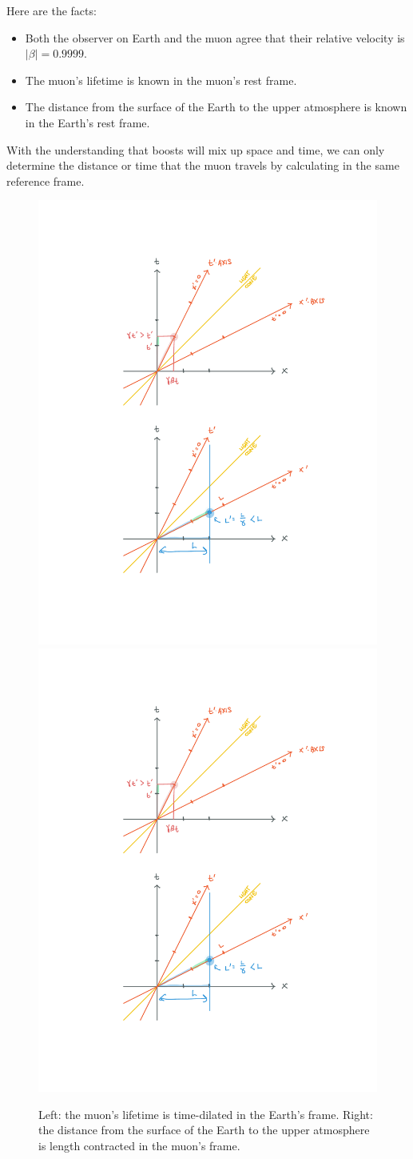\documentclass[12pt]{article}
\begin{document}

Here are the facts:
\begin{itemize}
    \item Both the observer on Earth and the muon agree that their relative velocity is $|\beta| = 0.9999$. 
    \item The muon's lifetime is known in the muon's rest frame. 
    \item The distance from the surface of the Earth to the upper atmosphere is known in the Earth's rest frame. 
\end{itemize}
With the understanding that boosts will mix up space and time, we can only determine the distance or time that the muon travels by calculating in the same reference frame. 


\begin{figure}[tb]
    \centering
    \includegraphics[width=.48\textwidth]{figures/rel_time_dil.pdf}
    \quad
    \includegraphics[width=.48\textwidth]{figures/rel_len_contractino.pdf}
    \caption{Left: the muon's lifetime is time-dilated in the Earth's frame. Right: the distance from the surface of the Earth to the upper atmosphere is length contracted in the muon's frame. }
    \label{fig:re:axes}
\end{figure}
\end{document}
